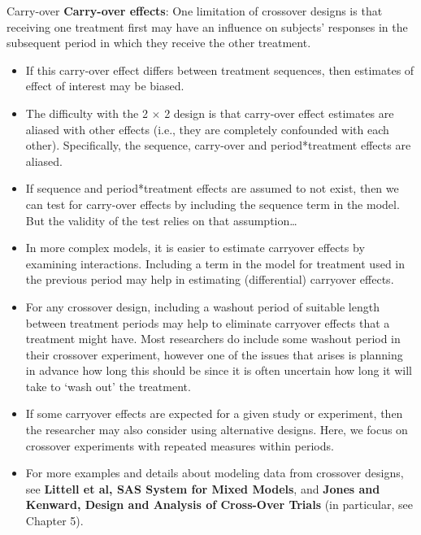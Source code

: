 \documentclass[
  9pt,
  ignorenonframetext,
]{beamer}
\begin{document}
\begin{frame}{Carry-over}
\protect\hypertarget{carry-over}{}
\textbf{Carry-over effects}: One limitation of crossover designs is that
receiving one treatment first may have an influence on subjects'
responses in the subsequent period in which they receive the other
treatment.

\begin{itemize}
\item
  If this carry-over effect differs between treatment sequences, then
  estimates of effect of interest may be biased.
\item
  The difficulty with the 2 \(\times\) 2 design is that carry-over
  effect estimates are aliased with other effects (i.e., they are
  completely confounded with each other). Specifically, the sequence,
  carry-over and period*treatment effects are aliased.
\item
  If sequence and period*treatment effects are assumed to not exist,
  then we can test for carry-over effects by including the sequence term
  in the model. But the validity of the test relies on that
  assumption\ldots{}
\item
  In more complex models, it is easier to estimate carryover effects by
  examining interactions. Including a term in the model for treatment
  used in the previous period may help in estimating (differential)
  carryover effects.
\end{itemize}
\end{frame}

\begin{frame}{}
\protect\hypertarget{section-5}{}
\begin{itemize}
\item
  For any crossover design, including a washout period of suitable
  length between treatment periods may help to eliminate carryover
  effects that a treatment might have. Most researchers do include some
  washout period in their crossover experiment, however one of the
  issues that arises is planning in advance how long this should be
  since it is often uncertain how long it will take to `wash out' the
  treatment.
\item
  If some carryover effects are expected for a given study or
  experiment, then the researcher may also consider using alternative
  designs. Here, we focus on crossover experiments with repeated
  measures within periods.
\item
  For more examples and details about modeling data from crossover
  designs, see \textbf{Littell et al, SAS System for Mixed Models}, and
  \textbf{Jones and Kenward, Design and Analysis of Cross-Over Trials}
  (in particular, see Chapter 5).
\end{itemize}
\end{frame}
\end{document}
